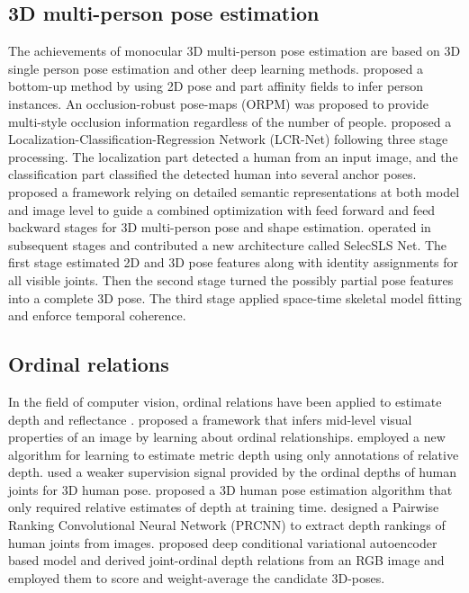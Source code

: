 \documentclass[letterpaper]{article} \usepackage{aaai21}  \usepackage{times}  \usepackage{helvet} \usepackage{courier}  \usepackage[hyphens]{url}  \usepackage{graphicx} \urlstyle{rm} \def\UrlFont{\rm}  \usepackage{natbib}  \usepackage{caption} \frenchspacing  \setlength{\pdfpagewidth}{8.5in}  \setlength{\pdfpageheight}{11in}
\begin{document}
\subsection{3D multi-person pose estimation}
The achievements of monocular 3D multi-person pose estimation are based on 3D single person pose estimation and other deep learning methods. \cite{mehta2018single} proposed a bottom-up method by using 2D pose and part affinity fields to infer person instances. An occlusion-robust pose-maps (ORPM) was proposed to provide multi-style occlusion information regardless of the number of people. \cite{rogez2017lcr} proposed a Localization-Classification-Regression Network (LCR-Net) following three stage processing. The localization part detected a human from an input image, and the classification part classified the detected human into several anchor poses. \cite{zanfir2018monocular} proposed a framework relying on detailed semantic representations at both model and image level to guide a combined optimization with feed forward and feed backward stages for 3D multi-person pose and shape estimation. \cite{mehta2020xnect} operated
in subsequent stages and contributed a new architecture called SelecSLS Net. The first stage estimated 2D and 3D pose features along with identity assignments for all visible joints. Then the second stage turned the possibly partial pose features into a complete 3D pose. The third stage applied space-time skeletal model fitting and enforce temporal coherence.


\subsection{Ordinal relations}

In the field of computer vision, ordinal relations have been applied to estimate depth \cite{zoran2015learning,chen2016single} and reflectance \cite{zhou2015learning}. \cite{zoran2015learning} proposed a framework that infers mid-level visual properties of an image by learning about ordinal relationships. \cite{chen2016single} employed a new algorithm for learning to estimate metric depth using only annotations of relative depth. \cite{pavlakos2018ordinal} used a weaker supervision signal provided by the ordinal depths of human joints for 3D human pose. \cite{ronchi2018s} proposed a 3D human pose estimation algorithm that only required relative estimates of depth at training time. \cite{wang2018drpose3d} designed a Pairwise Ranking Convolutional Neural Network (PRCNN) to extract depth rankings of human joints from images. \cite{sharma2019monocular} proposed deep conditional variational autoencoder based model and derived joint-ordinal depth relations from an RGB image and employed them to score and weight-average the candidate 3D-poses.
\end{document}

